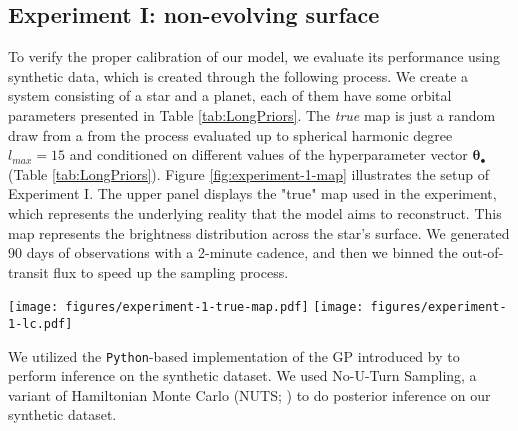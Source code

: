 \documentclass[twocolumn]{aastex631}
\begin{document}
\subsection{Experiment I: non-evolving surface}
\label{sec:experiment1}
To verify the proper calibration of our model, we evaluate its performance using synthetic data, which is created through the following process.
We create a system consisting of a star and a planet, each of them have some orbital parameters presented in Table \ref{tab:LongPriors}. 
The \textit{true} map is just a random draw from a from the process evaluated up to spherical harmonic degree
$l_{max} = 15$ and conditioned on different values of the hyperparameter vector $\pmb{\theta}_\bullet$ (Table \ref{tab:LongPriors}). Figure \ref{fig:experiment-1-map} 
illustrates the setup of Experiment I. The upper panel displays the "true" map used in the experiment, which represents the underlying reality that 
the model aims to reconstruct. This map represents the brightness distribution across the star's surface. We generated 90 days of observations with a 2-minute
cadence, and then we binned the out-of-transit flux to speed up the sampling process.
\begin{figure*}[ht!]
    \begin{centering}
        \texttt{[image: figures/experiment-1-true-map.pdf]}
        \texttt{[image: figures/experiment-1-lc.pdf]}
        \caption{
            The upper panel shows the \textit{true} map for the Experiment I of this paper. The black dots on the map indicate the trajectory of the 
            planet as it moves across the face of the star during the transit event. The left panel 
            shows the stellar map along with its orientation on the sky and the right panel shows the rectangular projection of the map. 
            The bottom panel is the generated light curve. The black line is the \textit{true} light curve and the blue dots show the binned light curve
            that's used in the model.
        }
        \label{fig:experiment-1-map}
    \end{centering}
\end{figure*}

We utilized the \texttt{Python}-based implementation of the GP introduced by \cite{Luger2021b} to perform inference on the synthetic dataset. 
We used No-U-Turn Sampling, a variant of Hamiltonian Monte Carlo 
(NUTS; \cite{Duane1987,Hoffman2011}) to do posterior inference on our synthetic dataset.
\end{document}

